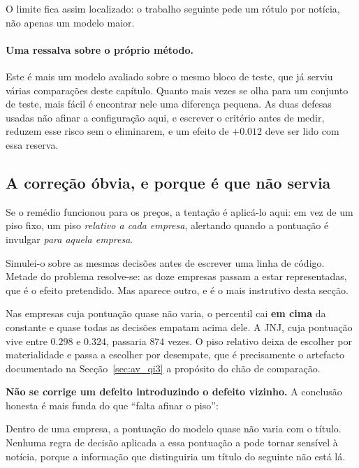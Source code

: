 O limite fica assim localizado: o trabalho seguinte pede um rótulo por notícia, não apenas um
modelo maior.

\paragraph{Uma ressalva sobre o próprio método.} Este é mais um modelo avaliado sobre o mesmo
bloco de teste, que já serviu várias comparações deste capítulo. Quanto mais vezes se olha para um
conjunto de teste, mais fácil é encontrar nele uma diferença pequena. As duas defesas usadas
não afinar a configuração aqui, e escrever o critério antes de medir, reduzem esse risco
sem o eliminarem, e um efeito de $+0.012$ deve ser lido com essa reserva.

\subsection{A correção óbvia, e porque é que não servia}

Se o remédio funcionou para os preços, a tentação é aplicá-lo aqui: em vez de um piso fixo, um piso
\emph{relativo a cada empresa}, alertando quando a pontuação é invulgar \emph{para aquela empresa}.

Simulei-o sobre as mesmas decisões antes de escrever uma linha de código. Metade do problema
resolve-se: as doze empresas passam a estar representadas, que é o efeito pretendido. Mas aparece
outro, e é o mais instrutivo desta secção.

Nas empresas cuja pontuação quase não varia, o percentil cai \textbf{em cima} da constante e quase
todas as decisões empatam acima dele. A JNJ, cuja pontuação vive entre $0.298$ e $0.324$, passaria
$874$ vezes. O piso relativo deixa de escolher por materialidade e passa a escolher por desempate,
que é precisamente o artefacto documentado na Secção~\ref{sec:av_qi3} a propósito do chão de
comparação.

\textbf{Não se corrige um defeito introduzindo o defeito vizinho.} A conclusão honesta é mais funda
do que ``falta afinar o piso'':

\begin{tcolorbox}[colback=black!3, colframe=black!35, boxrule=0.5pt, arc=2pt]
Dentro de uma empresa, a pontuação do modelo quase não varia com o título. Nenhuma regra de
decisão aplicada a essa pontuação a pode tornar sensível à notícia, porque a informação que
distinguiria um título do seguinte não está lá.
\end{tcolorbox}

